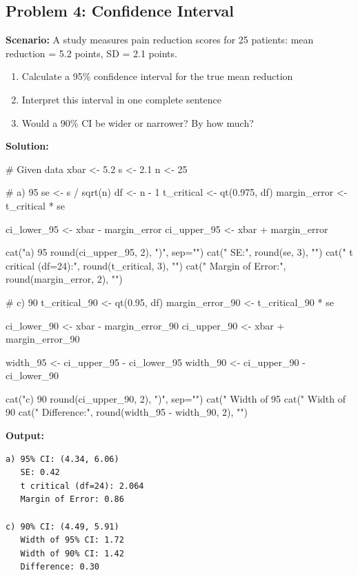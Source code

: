 \documentclass[11pt]{article}
\begin{document}
\subsection{Problem 4: Confidence Interval}

\textbf{Scenario:} A study measures pain reduction scores for 25 patients: mean reduction = 5.2 points, SD = 2.1 points.

\begin{enumerate}[label=\alph*)]
\item Calculate a 95\% confidence interval for the true mean reduction
\item Interpret this interval in one complete sentence
\item Would a 90\% CI be wider or narrower? By how much?
\end{enumerate}

\textbf{Solution:}

\begin{rcode}
# Given data
xbar <- 5.2
s <- 2.1
n <- 25

# a) 95%
se <- s / sqrt(n)
df <- n - 1
t_critical <- qt(0.975, df)
margin_error <- t_critical * se

ci_lower_95 <- xbar - margin_error
ci_upper_95 <- xbar + margin_error

cat("a) 95%
    round(ci_upper_95, 2), ")\n", sep="")
cat("   SE:", round(se, 3), "\n")
cat("   t critical (df=24):", round(t_critical, 3), "\n")
cat("   Margin of Error:", round(margin_error, 2), "\n\n")

# c) 90%
t_critical_90 <- qt(0.95, df)
margin_error_90 <- t_critical_90 * se

ci_lower_90 <- xbar - margin_error_90
ci_upper_90 <- xbar + margin_error_90

width_95 <- ci_upper_95 - ci_lower_95
width_90 <- ci_upper_90 - ci_lower_90

cat("c) 90%
    round(ci_upper_90, 2), ")\n", sep="")
cat("   Width of 95%
cat("   Width of 90%
cat("   Difference:", round(width_95 - width_90, 2), "\n")
\end{rcode}

\begin{routput}
\textbf{Output:}
\begin{verbatim}
a) 95% CI: (4.34, 6.06)
   SE: 0.42
   t critical (df=24): 2.064
   Margin of Error: 0.86

c) 90% CI: (4.49, 5.91)
   Width of 95% CI: 1.72
   Width of 90% CI: 1.42
   Difference: 0.30
\end{verbatim}
\end{routput}
\end{document}
